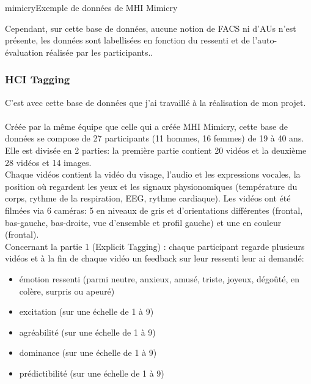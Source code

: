 \documentclass[overfullbox, poster]{polytech/polytech}
\begin{document}
\begin{Figure}{mimicry}{Exemple de données de MHI Mimicry}
\end{Figure}

Cependant, sur cette base de données, aucune notion de FACS ni d'AUs n'est présente, les données sont labellisées en fonction du ressenti et de l'auto-évaluation réalisée par les participants..

\subsubsection{HCI Tagging \cite{tagging1} \cite{tagging2}}
C'est avec cette base de données que j'ai travaillé à la réalisation de mon projet.\\\\
Créée par la même équipe que celle qui a créée MHI Mimicry, cette base de données se compose de 27 participants (11 hommes, 16 femmes) de 19 à 40 ans.\\
Elle est divisée en 2 parties: la première partie contient 20 vidéos et la deuxième 28 vidéos et 14 images.\\
Chaque vidéos contient la vidéo du visage, l'audio et les expressions vocales, la position où regardent les yeux et les signaux physionomiques (température du corps, rythme de la respiration, EEG, rythme cardiaque). Les vidéos ont été filmées via 6 caméras: 5 en niveaux de gris et d'orientations différentes (frontal, bas-gauche, bas-droite, vue d'ensemble et profil gauche) et une en couleur (frontal).\\
Concernant la partie 1 (Explicit Tagging) : chaque participant regarde plusieurs vidéos et à la fin de chaque vidéo un feedback sur leur ressenti leur ai demandé:
\begin{itemize}
\item émotion ressenti (parmi neutre, anxieux, amusé, triste, joyeux, dégoûté, en colère, surpris ou apeuré)
\item excitation (sur une échelle de 1 à 9)
\item agréabilité (sur une échelle de 1 à 9)
\item dominance (sur une échelle de 1 à 9)
\item prédictibilité (sur une échelle de 1 à 9)
\end{itemize}
\end{document}
